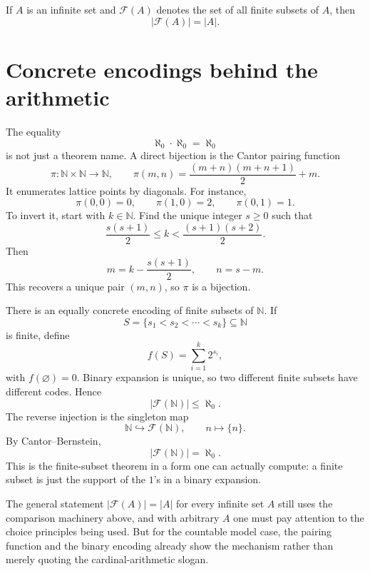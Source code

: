 \begin{corollary}
If \(A\) is an infinite set and \(\mathcal F(A)\) denotes the set of all finite subsets of \(A\), then
\[
  |\mathcal F(A)|=|A|.
\]
\end{corollary}

\section{Concrete encodings behind the arithmetic}

The equality
\[
  \aleph_0\cdot\aleph_0=\aleph_0
\]
is not just a theorem name.  A direct bijection is the Cantor pairing function
\[
  \pi:\mathbb N\times\mathbb N\to\mathbb N,
  \qquad
  \pi(m,n)=\frac{(m+n)(m+n+1)}2+m.
\]
It enumerates lattice points by diagonals.  For instance,
\[
  \pi(0,0)=0,\qquad
  \pi(1,0)=2,\qquad
  \pi(0,1)=1.
\]
To invert it, start with \(k\in\mathbb N\).  Find the unique integer \(s\ge0\) such that
\[
  \frac{s(s+1)}2\le k<\frac{(s+1)(s+2)}2.
\]
Then
\[
  m=k-\frac{s(s+1)}2,\qquad n=s-m.
\]
This recovers a unique pair \((m,n)\), so \(\pi\) is a bijection.

There is an equally concrete encoding of finite subsets of \(\mathbb N\).  If
\[
  S=\{s_1<s_2<\cdots<s_k\}\subseteq\mathbb N
\]
is finite, define
\[
  f(S)=\sum_{i=1}^k2^{s_i},
\]
with \(f(\varnothing)=0\).  Binary expansion is unique, so two different finite subsets have different codes.  Hence
\[
  |\mathcal F(\mathbb N)|\le\aleph_0.
\]
The reverse injection is the singleton map
\[
  \mathbb N\hookrightarrow \mathcal F(\mathbb N),
  \qquad
  n\mapsto\{n\}.
\]
By Cantor--Bernstein,
\[
  |\mathcal F(\mathbb N)|=\aleph_0.
\]
This is the finite-subset theorem in a form one can actually compute: a finite subset is just the support of the \(1\)'s in a binary expansion.

\begin{gap}
The general statement \(|\mathcal F(A)|=|A|\) for every infinite set \(A\) still uses the comparison machinery above, and with arbitrary \(A\) one must pay attention to the choice principles being used.  But for the countable model case, the pairing function and the binary encoding already show the mechanism rather than merely quoting the cardinal-arithmetic slogan.
\end{gap}
